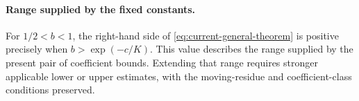 \paragraph{Range supplied by the fixed constants.}
For $1/2<b<1$, the right-hand side of \eqref{eq:current-general-theorem}
is positive precisely when $b>\exp(-c/K)$. This value describes the range
supplied by the present pair of coefficient bounds. Extending that range
requires stronger applicable lower or upper estimates, with the
moving-residue and coefficient-class conditions preserved.
